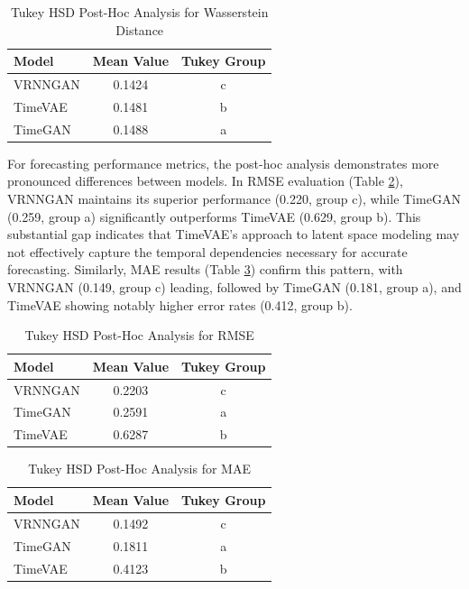 \documentclass{article}
\begin{document}
\begin{table}[H]
\centering
\caption{Tukey HSD Post-Hoc Analysis for Wasserstein Distance}
\label{tab:tukey_wasserstein}
\begin{tabular}{lcc}
\toprule
\textbf{Model} & \textbf{Mean Value} & \textbf{Tukey Group} \\
\midrule
VRNNGAN & 0.1424 & c \\
TimeVAE & 0.1481 & b \\
TimeGAN & 0.1488 & a \\
\bottomrule
\end{tabular}
\footnotesize
\end{table}

For forecasting performance metrics, the post-hoc analysis demonstrates more pronounced differences between models. In RMSE evaluation (Table \ref{tab:tukey_rmse}), VRNNGAN maintains its superior performance (0.220, group c), while TimeGAN (0.259, group a) significantly outperforms TimeVAE (0.629, group b). This substantial gap indicates that TimeVAE's approach to latent space modeling may not effectively capture the temporal dependencies necessary for accurate forecasting. Similarly, MAE results (Table \ref{tab:tukey_mae}) confirm this pattern, with VRNNGAN (0.149, group c) leading, followed by TimeGAN (0.181, group a), and TimeVAE showing notably higher error rates (0.412, group b).


\begin{table}[H]
\centering
\caption{Tukey HSD Post-Hoc Analysis for RMSE}
\label{tab:tukey_rmse}
\begin{tabular}{lcc}
\toprule
\textbf{Model} & \textbf{Mean Value} & \textbf{Tukey Group} \\
\midrule
VRNNGAN & 0.2203 & c \\
TimeGAN & 0.2591 & a \\
TimeVAE & 0.6287 & b \\
\bottomrule
\end{tabular}
\footnotesize
\end{table}

\begin{table}[H]
\centering
\caption{Tukey HSD Post-Hoc Analysis for MAE}
\label{tab:tukey_mae}
\begin{tabular}{lcc}
\toprule
\textbf{Model} & \textbf{Mean Value} & \textbf{Tukey Group} \\
\midrule
VRNNGAN & 0.1492 & c \\
TimeGAN & 0.1811 & a \\
TimeVAE & 0.4123 & b \\
\bottomrule
\end{tabular}
\footnotesize
\end{table}
\end{document}
